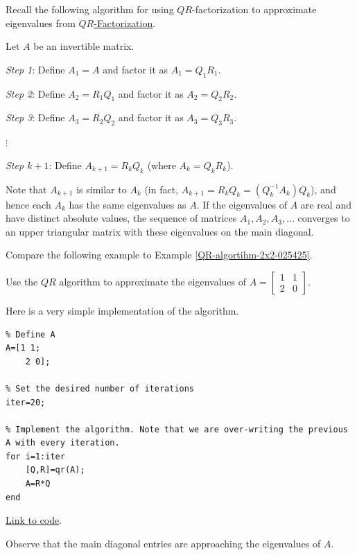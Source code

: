\documentclass{ximera}
\begin{document}
Recall the following algorithm for using $QR$-factorization to approximate eigenvalues from \href{https://ximera.osu.edu/linearalgebradzv3/LinearAlgebraInteractiveIntro/RTH-0040/main}{$QR$-Factorization}.
 
\begin{algorithm}[\ref{alg:qrEig}]
Let $A$ be an invertible matrix.
 
\emph{Step 1}: Define $A_{1} = A$ and factor it as $A_{1} = Q_{1}R_{1}$.
 
\emph{Step 2}: Define $A_{2} = R_{1}Q_{1}$ and factor it as $A_{2} = Q_{2}R_{2}$.
 
\emph{Step 3}: Define $A_{3} = R_{2}Q_{2}$ and factor it as $A_{3} = Q_{3}R_{3}$.
 
 $\vdots$
  
\emph{Step $k+1$}: Define $A_{k + 1} = R_{k}Q_{k}$ (where $A_{k} = Q_{k}R_{k}$).
 
Note that $A_{k + 1}$ is similar to $A_{k}$ (in fact, $A_{k+1} = R_{k}Q_{k} = (Q_{k}^{-1}A_{k})Q_{k}$), and hence each $A_{k}$ has the same eigenvalues as $A$. If the eigenvalues of $A$ are real and have distinct absolute values, the sequence of matrices $A_{1}, A_{2}, A_{3}, \dots$ converges to an upper triangular matrix with these eigenvalues on the main diagonal.
\end{algorithm}
 
Compare the following example to Example \ref{QR-algortihm-2x2-025425}.
 
\begin{example}\label{ex:qrEig}
Use the $QR$ algorithm to approximate the eigenvalues of $A=\begin{bmatrix}1 & 1\\2 & 0\end{bmatrix}$. 
 
\begin{explanation}
    Here is a very simple implementation of the algorithm. 
 
    \begin{verbatim}
% Define A
A=[1 1;
    2 0];
 
% Set the desired number of iterations
iter=20; 
 
% Implement the algorithm. Note that we are over-writing the previous A with every iteration.
for i=1:iter
    [Q,R]=qr(A);
    A=R*Q
end   
    \end{verbatim}
 
\href{https://sagecell.sagemath.org/?z=eJwtjbEKwkAQRPuF_YdpAioWuZSGKw78gcQypFBuD7fwDjfn_5tDp3oMvJkOV0maBYEp-MXBjUzYM6Bfd2TqcJOK-hRE2dQkIn9eDzGUBK1i96olb0yN_dCPQLNSMah3l9b-BpfpPK_-bYdw_F8EP58mJsnxCzFCIso=&lang=octave&interacts=eJyLjgUAARUAuQ==}{Link to code}.  
 
Observe that the main diagonal entries are approaching the eigenvalues of $A$.
\end{explanation}
     
\end{example}
 
\end{document}
